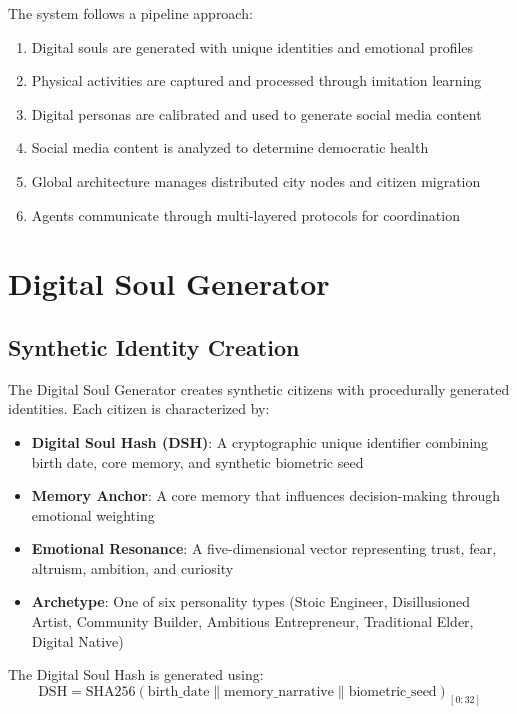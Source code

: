 \documentclass[12pt,a4paper]{article}
\begin{document}
The system follows a pipeline approach:
\begin{enumerate}
    \item Digital souls are generated with unique identities and emotional profiles
    \item Physical activities are captured and processed through imitation learning
    \item Digital personas are calibrated and used to generate social media content
    \item Social media content is analyzed to determine democratic health
    \item Global architecture manages distributed city nodes and citizen migration
    \item Agents communicate through multi-layered protocols for coordination
\end{enumerate}

\section{Digital Soul Generator}

\subsection{Synthetic Identity Creation}

The Digital Soul Generator creates synthetic citizens with procedurally generated identities. Each citizen is characterized by:

\begin{itemize}
    \item \textbf{Digital Soul Hash (DSH)}: A cryptographic unique identifier combining birth date, core memory, and synthetic biometric seed
    \item \textbf{Memory Anchor}: A core memory that influences decision-making through emotional weighting
    \item \textbf{Emotional Resonance}: A five-dimensional vector representing trust, fear, altruism, ambition, and curiosity
    \item \textbf{Archetype}: One of six personality types (Stoic Engineer, Disillusioned Artist, Community Builder, Ambitious Entrepreneur, Traditional Elder, Digital Native)
\end{itemize}

The Digital Soul Hash is generated using:
\begin{equation}
\text{DSH} = \text{SHA256}(\text{birth\_date} \| \text{memory\_narrative} \| \text{biometric\_seed})_{[0:32]}
\end{equation}
\end{document}
